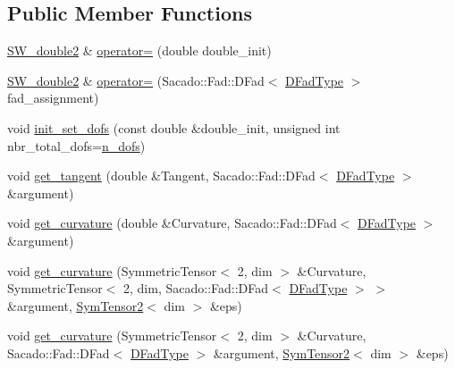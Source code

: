 \subsection*{Public Member Functions}
\begin{DoxyCompactItemize}
\item 
\hyperlink{classSacado__Wrapper_1_1SW__double2}{S\+W\+\_\+double2} \& \hyperlink{classSacado__Wrapper_1_1SW__double2_a6f0538f891bd49efa54cc508da477f2e}{operator=} (double double\+\_\+init)
\item 
\hyperlink{classSacado__Wrapper_1_1SW__double2}{S\+W\+\_\+double2} \& \hyperlink{classSacado__Wrapper_1_1SW__double2_a426ab490411a347540e5af7028638495}{operator=} (Sacado\+::\+Fad\+::\+D\+Fad$<$ \hyperlink{Sacado__Wrapper_8h_a7e0893207b87dad05c66a34baac8ed2e}{D\+Fad\+Type} $>$ fad\+\_\+assignment)
\item 
void \hyperlink{classSacado__Wrapper_1_1SW__double2_af633ef0195198f1fed2bb44106af33c5}{init\+\_\+set\+\_\+dofs} (const double \&double\+\_\+init, unsigned int nbr\+\_\+total\+\_\+dofs=\hyperlink{classSacado__Wrapper_1_1SW__double2_a535aa77392e896e21151bfc63f92e020}{n\+\_\+dofs})
\item 
void \hyperlink{classSacado__Wrapper_1_1SW__double2_ad51ba1e79171d60861b28098dfef903d}{get\+\_\+tangent} (double \&Tangent, Sacado\+::\+Fad\+::\+D\+Fad$<$ \hyperlink{Sacado__Wrapper_8h_a7e0893207b87dad05c66a34baac8ed2e}{D\+Fad\+Type} $>$ \&argument)
\item 
void \hyperlink{classSacado__Wrapper_1_1SW__double2_a7d3f3a21cd842645af9861bf50308825}{get\+\_\+curvature} (double \&Curvature, Sacado\+::\+Fad\+::\+D\+Fad$<$ \hyperlink{Sacado__Wrapper_8h_a7e0893207b87dad05c66a34baac8ed2e}{D\+Fad\+Type} $>$ \&argument)
\item 
void \hyperlink{classSacado__Wrapper_1_1SW__double2_a21da9eedb0c0e0d7db441426a5519a1a}{get\+\_\+curvature} (Symmetric\+Tensor$<$ 2, dim $>$ \&Curvature, Symmetric\+Tensor$<$ 2, dim, Sacado\+::\+Fad\+::\+D\+Fad$<$ \hyperlink{Sacado__Wrapper_8h_a7e0893207b87dad05c66a34baac8ed2e}{D\+Fad\+Type} $>$ $>$ \&argument, \hyperlink{classSacado__Wrapper_1_1SymTensor2}{Sym\+Tensor2}$<$ dim $>$ \&eps)
\item 
void \hyperlink{classSacado__Wrapper_1_1SW__double2_ac99cef52c5af3c6516aecf940275c595}{get\+\_\+curvature} (Symmetric\+Tensor$<$ 2, dim $>$ \&Curvature, Sacado\+::\+Fad\+::\+D\+Fad$<$ \hyperlink{Sacado__Wrapper_8h_a7e0893207b87dad05c66a34baac8ed2e}{D\+Fad\+Type} $>$ \&argument, \hyperlink{classSacado__Wrapper_1_1SymTensor2}{Sym\+Tensor2}$<$ dim $>$ \&eps)
\end{DoxyCompactItemize}
